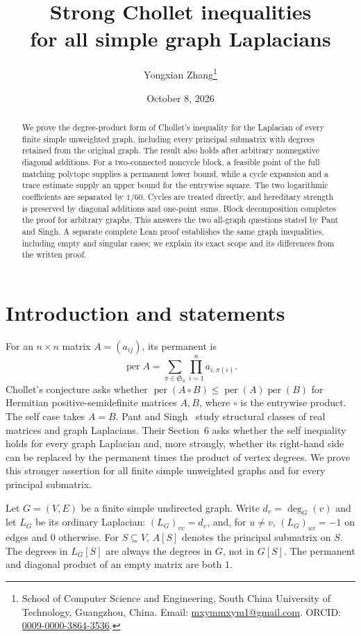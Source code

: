 \documentclass[11pt]{article}
\title{Strong Chollet inequalities\protect\\for all simple graph Laplacians}
\author{Yongxian Zhang\thanks{School of Computer Science and Engineering,
South China University of Technology, Guangzhou, China.
Email: \href{mailto:mxymmxym1@gmail.com}{mxymmxym1@gmail.com}.
ORCID: \href{https://orcid.org/0009-0000-3864-3536}{0009-0000-3864-3536}.}}
\date{October 8, 2026}
\theoremstyle{remark}\newtheorem{remark}[theorem]{Remark}
\DeclareMathOperator{\per}{per}
\begin{document}
\maketitle
\begin{abstract}
We prove the degree-product form of Chollet's inequality for the Laplacian
of every finite simple unweighted graph, including every principal
submatrix with degrees retained from the original graph. The result also
holds after arbitrary nonnegative diagonal additions. For a two-connected
noncycle block, a feasible point of the full matching polytope supplies a
permanent lower bound, while a cycle expansion and a trace estimate supply
an upper bound for the entrywise square. The two logarithmic coefficients
are separated by $1/60$. Cycles are treated directly, and hereditary
strength is preserved by diagonal additions and one-point sums. Block
decomposition completes the proof for arbitrary graphs. This answers the
two all-graph questions stated by Pant and Singh. A separate complete Lean
proof establishes the same graph inequalities, including empty and singular
cases; we explain its exact scope and its differences from the written proof.
\end{abstract}

\section{Introduction and statements}\label{sec:intro}
For an $n\times n$ matrix $A=(a_{ij})$, its permanent is
\[
\per A=\sum_{\pi\in\mathfrak S_n}\prod_{i=1}^n a_{i,\pi(i)}.
\]
Chollet's conjecture asks whether
$\per(A\circ B)\le\per(A)\per(B)$ for Hermitian positive-semidefinite
matrices $A,B$, where $\circ$ is the entrywise product.
The self case takes $A=B$. Pant and Singh~\cite{PantSingh} study structural
classes of real matrices and graph Laplacians. Their Section~6 asks whether
the self inequality holds for every graph Laplacian and, more strongly,
whether its right-hand side can be replaced by the permanent times the
product of vertex degrees. We prove this stronger assertion for all finite
simple unweighted graphs and for every principal submatrix.

Let $G=(V,E)$ be a finite simple undirected graph. Write $d_v=\deg_G(v)$
and let $L_G$ be its ordinary Laplacian: $(L_G)_{vv}=d_v$, and, for
$u\ne v$, $(L_G)_{uv}=-1$ on edges and $0$ otherwise.
For $S\subseteq V$, $A[S]$ denotes the principal submatrix on $S$.
The degrees in $L_G[S]$ are always the degrees in $G$, not in $G[S]$.
The permanent and diagonal product of an empty matrix are both $1$.
\end{document}
